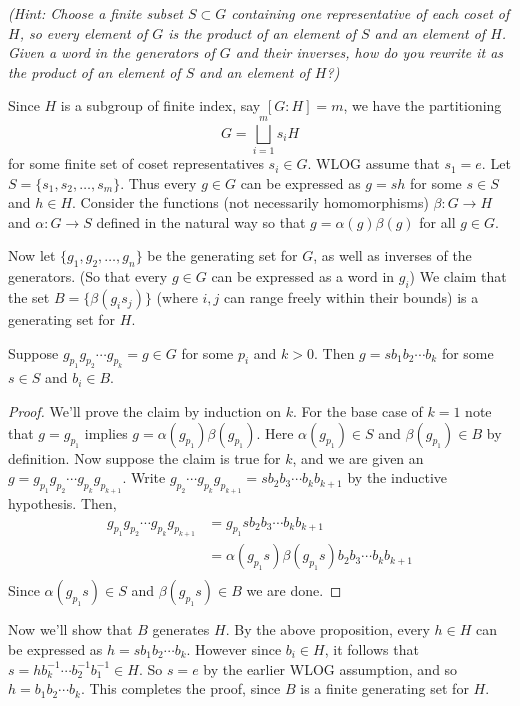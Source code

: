 \documentclass[11pt,letterpaper]{article}
\begin{document}
\textit{(Hint: Choose a finite subset $S\subset G$ containing one representative of each coset of $H$, so every element of $G$ is the product of an element of $S$ and an element of $H$. Given a word in the generators of $G$ and their inverses, how do you rewrite it as the product of an element of $S$ and an element of $H$?)}
 
Since $H$ is a subgroup of finite index, say $[G : H]=m$, we have the partitioning
\[G=\bigsqcup_{i=1}^m s_iH\]
for some finite set of coset representatives $s_i\in G$. WLOG assume that $s_1=e$. Let $S=\{ s_1,s_2,\ldots, s_m\}$. Thus every $g\in G$ can be expressed as $g=sh$ for some $s\in S$ and $h\in H$. Consider the functions (not necessarily homomorphisms) $\beta : G \to H$ and $\alpha : G \to S$ defined in the natural way so that $g=\alpha(g)\beta(g)$ for all $g\in G$. 

Now let $\{ g_1,g_2,\ldots, g_n\}$ be the generating set for $G$, as well as inverses of the generators. (So that every $g\in G$ can be expressed as a word in $g_i$) We claim that the set $B=\{\beta(g_is_j)\}$ (where $i,j$ can range freely within their bounds) is a generating set for $H$.

\begin{proposition}
  Suppose $g_{p_1}g_{p_{2}}\cdots g_{p_k}=g\in G$ for some $p_i$ and $k>0$. Then $g=sb_1b_2\cdots b_k$ for some $s\in S$ and $b_i\in B$.    
\end{proposition}     
\begin{proof}
  We'll prove the claim by induction on $k$. For the base case of $k=1$ note that $g=g_{p_1}$ implies $g=\alpha(g_{p_1})\beta(g_{p_1})$. Here $\alpha(g_{p_1})\in S$ and $\beta(g_{p_1})\in B$ by definition. Now suppose the claim is true for $k$, and we are given an $g=g_{p_1}g_{p_{2}}\cdots g_{p_k}g_{p_{k+1}}$. Write $g_{p_{2}}\cdots g_{p_k}g_{p_{k+1}}=sb_2b_3\cdots b_kb_{k+1}$ by the inductive hypothesis. Then,
  \begin{align*}
    g_{p_{1}}g_{p_{2}}\cdots g_{p_k}g_{p_{k+1}}&=g_{p_1}sb_2b_3\cdots b_kb_{k+1}\\
    &=\alpha(g_{p_1}s)\beta(g_{p_1}s)b_2b_3\cdots b_kb_{k+1}\\
  \end{align*}
  Since $\alpha(g_{p_1}s)\in S$ and $\beta(g_{p_1}s)\in B$ we are done.       
\end{proof}

Now we'll show that $B$ generates $H$. By the above proposition, every $h\in H$ can be expressed as $h=sb_1 b_2 \cdots b_k$. However since $b_i\in H$, it follows that $s=hb_k^{-1}\cdots b_2^{-1}b_1^{-1}\in H$. So $s=e$ by the earlier WLOG assumption, and so $h=b_1b_2\cdots b_k$. This completes the proof, since $B$ is a finite generating set for $H$.      
\end{document}
